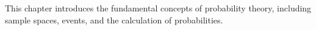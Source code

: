 This chapter introduces the fundamental concepts of probability theory, including sample spaces, events, and the calculation of probabilities.
